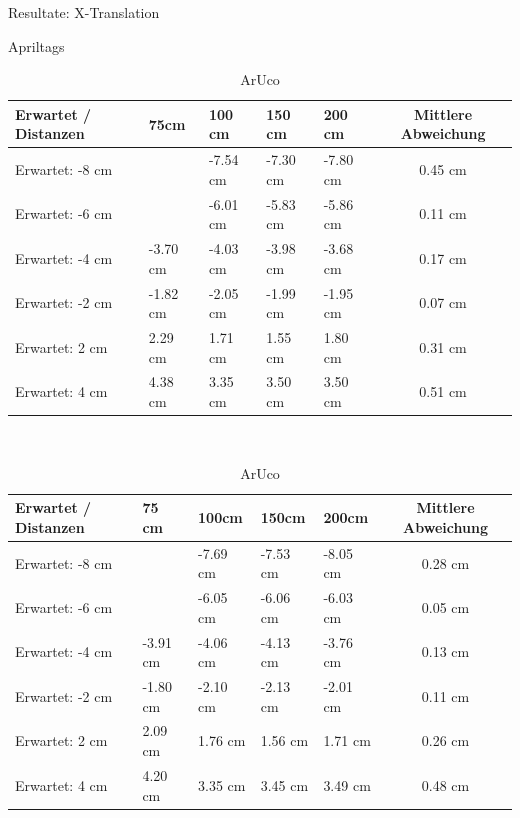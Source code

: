 \begin{table}[!htb]
    \caption{Resultate: X-Translation}
    \label{tab:xTrans}
    \begin{subtable}{.5\linewidth}
        \caption{Apriltags}
        \label{tab:xTransApril}
        \begin{tabular}{|l|l|l|l|l|c|}
            \hline
            Erwartet / Distanzen & 75cm & 100 cm & 150 cm & 200 cm  & Mittlere Abweichung\\
            \hline
            Erwartet: -8 cm &          & -7.54 cm & -7.30 cm & -7.80 cm & 0.45 cm\\
            \hline
            Erwartet: -6 cm &          & -6.01 cm & -5.83 cm  & -5.86 cm & 0.11 cm\\
            \hline
            Erwartet: -4 cm & -3.70 cm & -4.03 cm & -3.98 cm & -3.68 cm & 0.17 cm\\
            \hline
            Erwartet: -2 cm & -1.82 cm & -2.05 cm & -1.99 cm & -1.95 cm & 0.07 cm\\
            \hline
            Erwartet: 2 cm  & 2.29 cm & 1.71 cm & 1.55 cm & 1.80 cm & 0.31 cm\\
            \hline
            Erwartet: 4 cm  & 4.38 cm & 3.35 cm  & 3.50 cm & 3.50 cm & 0.51 cm\\
            \hline
        \end{tabular}
    \end{subtable}
    \\[\smallskipamount]
    \begin{subtable}{.5\linewidth}
        \caption{ArUco}
        \label{tab:xTransAruco}
        \begin{tabular}{|l|l|l|l|l|c|}
            \hline
            Erwartet / Distanzen & 75 cm & 100cm & 150cm & 200cm & Mittlere Abweichung\\
            \hline
            Erwartet:   -8 cm &          & -7.69 cm & -7.53 cm  & -8.05 cm & 0.28 cm\\
            \hline
            Erwartet:   -6 cm &          & -6.05 cm & -6.06 cm & -6.03 cm & 0.05 cm \\
            \hline
            Erwartet:   -4 cm & -3.91 cm & -4.06 cm & -4.13 cm & -3.76 cm & 0.13 cm \\
            \hline
            Erwartet:   -2 cm & -1.80 cm & -2.10 cm & -2.13 cm & -2.01 cm &  0.11 cm\\
            \hline
            Erwartet:   2 cm  & 2.09 cm & 1.76 cm & 1.56 cm & 1.71 cm & 0.26 cm\\
            \hline
            Erwartet:   4 cm  & 4.20 cm & 3.35 cm & 3.45 cm & 3.49 cm & 0.48 cm \\
            \hline
        \end{tabular}
    \end{subtable} 
\end{table}

